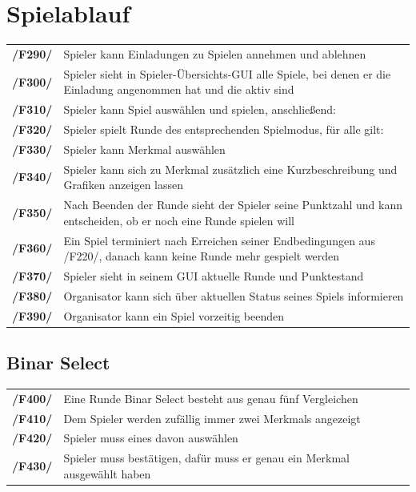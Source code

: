 \documentclass[a4paper]{scrreprt}
\begin{document}
    \section{Spielablauf} 
    \begin{tabularx}{\linewidth}{@{}>{\bfseries}l@{\hspace{.5em}}X@{}}
    /F290/ & \Gls{Spieler} kann Einladungen zu Spielen annehmen und ablehnen \\
    /F300/ & \Gls{Spieler} sieht in Spieler-Übersichts-GUI alle Spiele, bei denen er die Einladung angenommen hat und die aktiv sind \\
    /F310/ & \Gls{Spieler} kann \Gls{Spiel} auswählen und spielen, anschließend: \\
    /F320/ & \Gls{Spieler} spielt Runde des entsprechenden \Gls{Spielmodus}, für alle gilt: \\
    /F330/ & \Gls{Spieler} kann \Gls{Merkmal} auswählen \\
    /F340/ & \Gls{Spieler} kann sich zu \Gls{Merkmal} zusätzlich eine Kurzbeschreibung und Grafiken anzeigen lassen \\
    /F350/ & Nach Beenden der Runde sieht der \Gls{Spieler} seine Punktzahl und kann entscheiden, ob er noch eine Runde spielen will \\
	/F360/ & Ein \Gls{Spiel} terminiert nach Erreichen seiner Endbedingungen aus /F220/, danach kann keine Runde mehr gespielt werden \\
    /F370/ & \Gls{Spieler} sieht in seinem GUI aktuelle Runde und Punktestand \\
	/F380/ & \Gls{Organisator} kann sich über aktuellen Status seines \Gls{Spiel}s informieren \\ %
    /F390/ & \Gls{Organisator} kann ein \Gls{Spiel} vorzeitig beenden \\
    \end{tabularx}
    
    \subsection{\Gls{Binar Select}}
    \begin{tabularx}{\linewidth}{@{}>{\bfseries}l@{\hspace{.5em}}X@{}}
        /F400/ & Eine Runde \Gls{Binar Select} besteht aus genau fünf Vergleichen \\
    	/F410/ & Dem \Gls{Spieler} werden zufällig immer zwei \Glspl{Merkmal} angezeigt \\
    	/F420/ & \Gls{Spieler} muss eines davon auswählen \\
    	/F430/ & \Gls{Spieler} muss bestätigen, dafür muss er genau ein \Gls{Merkmal} ausgewählt haben \\
    \end{tabularx}
\end{document}
